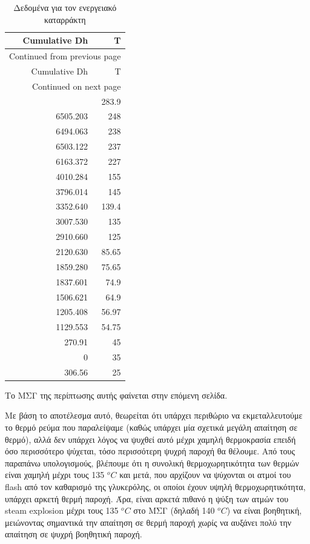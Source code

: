 \documentclass[11pt]{article}
\begin{document}
\begin{longtable}{rr}
\caption{Δεδομένα για τον ενεργειακό καταρράκτη}
\\
Cumulative  Dh & T\\
\hline
\endfirsthead
\multicolumn{2}{l}{Continued from previous page} \\
\hline

Cumulative  Dh & T \\

\hline
\endhead
\hline\multicolumn{2}{r}{Continued on next page} \\
\endfoot
\endlastfoot
\hline
6376.537 & 283.9\\
6505.203 & 248\\
6494.063 & 238\\
6503.122 & 237\\
6163.372 & 227\\
4010.284 & 155\\
3796.014 & 145\\
3352.640 & 139.4\\
3007.530 & 135\\
2910.660 & 125\\
2120.630 & 85.65\\
1859.280 & 75.65\\
1837.601 & 74.9\\
1506.621 & 64.9\\
1205.408 & 56.97\\
1129.553 & 54.75\\
270.91 & 45\\
0 & 35\\
306.56 & 25\\
\end{longtable}


Το ΜΣΓ της περίπτωσης αυτής φαίνεται στην επόμενη σελίδα.

Με βάση το αποτέλεσμα αυτό, θεωρείται ότι υπάρχει περιθώριο να εκμεταλλευτούμε το θερμό ρεύμα που παραλείψαμε (καθώς υπάρχει μία σχετικά μεγάλη απαίτηση σε θερμό), αλλά δεν υπάρχει λόγος να ψυχθεί αυτό μέχρι χαμηλή θερμοκρασία επειδή όσο περισσότερο ψύχεται, τόσο περισσότερη ψυχρή παροχή θα θέλουμε. Από τους παραπάνω υπολογισμούς, βλέπουμε ότι η συνολική θερμοχωρητικότητα των θερμών είναι χαμηλή μέχρι τους 135 \(^oC\) και μετά, που αρχίζουν να ψύχονται οι ατμοί του flash από τον καθαρισμό της γλυκερόλης, οι οποίοι έχουν υψηλή θερμοχωρητικότητα, υπάρχει αρκετή θερμή παροχή. Άρα, είναι αρκετά πιθανό η ψύξη των ατμών του steam explosion μέχρι τους 135 \(^oC\) στο ΜΣΓ (δηλαδή 140 \(^oC\)) να είναι βοηθητική, μειώνοντας σημαντικά την απαίτηση σε θερμή παροχή χωρίς να αυξάνει πολύ την απαίτηση σε ψυχρή βοηθητική παροχή.
\end{document}
